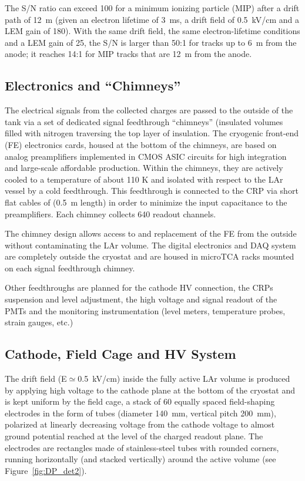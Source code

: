 The S/N ratio can exceed 100 for a minimum
ionizing particle (MIP) after a drift path of 12~m (given an
electron lifetime of 3~ms, a drift field of 0.5~kV/cm and a LEM gain
of 180). With the same drift field, the same electron-lifetime conditions and a
LEM gain of 25, the S/N is larger than 50:1 for tracks up to 6~m from
the anode; it reaches 14:1 for MIP tracks that are 12~m from the
anode.

\subsection{Electronics and ``Chimneys''}
 
The electrical signals from the collected charges
are passed to the outside of the tank via a set of dedicated signal
feedthrough ``chimneys'' (insulated volumes filled with nitrogen
traversing the top layer of insulation. 
The cryogenic front-end (FE) electronics cards, housed at the bottom of the
chimneys, are based on analog preamplifiers implemented in CMOS ASIC circuits for high integration and large-scale
affordable production. Within the chimneys, they are actively cooled to a temperature of about 110 K and
isolated with respect to the LAr vessel by a cold feedthrough.  This
feedthrough is connected to the CRP via short flat cables of (0.5~m length) in order to minimize the
input capacitance to the preamplifiers. Each chimney collects 640 readout channels.

The chimney design allows access to and replacement of the FE from the
outside without contaminating the LAr volume. The digital electronics
and DAQ system are completely outside the cryostat and are housed in
microTCA racks mounted on each signal feedthrough chimney. 

Other feedthroughs are planned for the cathode HV connection, the
CRPs suspension and level adjustment, the high voltage and signal
readout of the PMTs and the monitoring instrumentation (level meters,
temperature probes, strain gauges, etc.)

\subsection{Cathode, Field Cage and HV System}

The drift field (E${\simeq}$0.5~kV/cm) inside the fully
active LAr volume is produced by applying high voltage to the cathode
plane at the bottom of the cryostat and is kept uniform by the field cage, a stack
of 60 equally spaced field-shaping electrodes in the form of tubes
(diameter 140~mm,  vertical pitch 200~mm), polarized at linearly decreasing voltage from the cathode 
voltage to almost ground potential reached at the level of the charged readout plane.
The electrodes are rectangles made of stainless-steel tubes 
with rounded corners, running horizontally (and stacked vertically) around the
active volume (see Figure~\ref{fig:DP_det2}). 

